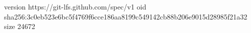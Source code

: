 version https://git-lfs.github.com/spec/v1
oid sha256:3c0eb523e6bc5f4769f6cce186aa8199c549142cb88b206e9015d28985f21a32
size 24672
